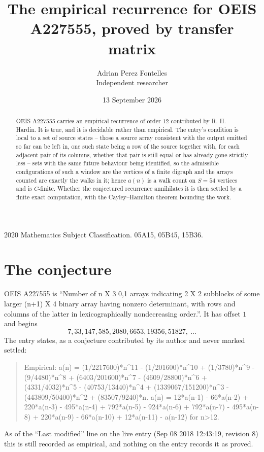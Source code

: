 \documentclass[11pt,a4paper]{article}
\title{The empirical recurrence for OEIS A227555, proved by transfer matrix}
\author{Adrian Perez Fontelles\\ \small Independent researcher}
\date{13 September 2026}
\theoremstyle{plain}
\theoremstyle{definition}
\begin{document}
\maketitle

\begin{abstract}
OEIS A227555 carries an empirical recurrence of order $12$ contributed by R. H. Hardin. It is
true, and it is decidable rather than empirical. The entry's condition is local to a set of source states -- those a source array consistent with the output emitted so far can be left in, one such state being a row of the source together with, for each adjacent pair of its columns, whether that pair is still equal or has already gone strictly less -- sets with the same future behaviour being identified, so
the admissible configurations of such a window are the vertices of a finite digraph and the
arrays counted are exactly the walks in it; hence $a(n)$ is a walk count on $S=54$ vertices
and is $C$-finite. Whether the conjectured recurrence annihilates it is then settled by a
finite exact computation, with the Cayley--Hamilton theorem bounding the work.
\end{abstract}

\noindent\small 2020 Mathematics Subject Classification. 05A15, 05B45, 15B36.\normalsize

\section{The conjecture}

OEIS A227555 is ``Number of n X 3 0,1 arrays indicating 2 X 2 subblocks of some larger (n+1) X 4 binary array having nonzero determinant, with rows and columns of the latter in lexicographically nondecreasing order.''. It has offset $1$ and begins
\[
7, 33, 147, 585, 2080, 6653, 19356, 51827,\ \dots
\]
The entry states, as a conjecture contributed by its author and never marked settled:
\begin{quote}
Empirical: a(n) = (1/2217600)*n\^{}11 - (1/201600)*n\^{}10 + (1/3780)*n\^{}9 - (9/4480)*n\^{}8 + (6403/201600)*n\^{}7 - (4609/28800)*n\^{}6 + (4331/4032)*n\^{}5 - (40753/13440)*n\^{}4 + (1339067/151200)*n\^{}3 - (443809/50400)*n\^{}2 + (83507/9240)*n. a(n) = 12*a(n-1) - 66*a(n-2) + 220*a(n-3) - 495*a(n-4) + 792*a(n-5) - 924*a(n-6) + 792*a(n-7) - 495*a(n-8) + 220*a(n-9) - 66*a(n-10) + 12*a(n-11) - a(n-12) for n>12.
\end{quote}
As of the ``Last modified'' line on the live entry (Sep 08 2018 12:43:19, revision 8) this is still
recorded as empirical, and nothing on the entry records it as proved.
\end{document}
